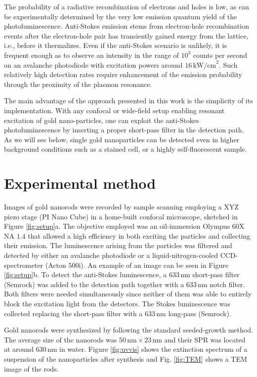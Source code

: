 \documentclass[journal=nalefd,manuscript=letter]{achemso}
\newcommand{\nm}{\ensuremath{\,\textrm{nm}}}
\newcommand{\pwr}{\ensuremath{\,\textrm{kW/cm}^2}}
\begin{document}
The probability of a radiative recombination of electrons and holes is low,
as can be experimentally determined by the very low emission quantum yield of
the photoluminescence\cite{Yorulmaz2012}\cite{Rao2015}\cite{Sonnichsen2002}. Anti-Stokes
emission stems from electron-hole recombination events after the electron-hole
pair has transiently gained energy from the lattice, i.e., before it thermalizes. Even if the
anti-Stokes scenario is unlikely, it is frequent enough as to observe an
intensity in the range of $10^3$ counts per second on an avalanche photodiode
with excitation powers around $16\pwr$. Such relatively high detection rates
require enhancement of the emission probability through the proximity of the
plasmon resonance\cite{Neupane2013}.

The main advantage of the approach presented in this work is the simplicity of
its implementation. With any confocal or wide-field setup enabling resonant
excitation of gold nano-particles, one can exploit the anti-Stokes
photoluminescence by inserting a proper short-pass filter in the detection path.
As we will see below, single gold nanoparticles can be detected even in higher background conditions
such as a stained cell, or a highly self-fluorescent sample.

\section{Experimental method}
Images of gold nanorods were recorded by sample scanning employing a XYZ piezo
stage (PI Nano Cube) in a  home-built confocal microscope, sketched in Figure
\ref{fig:setup}a. The objective employed was an oil-immersion Olympus 60X NA
$1.4$ that allowed a high efficiency in both exciting the particles and
collecting their emission. The luminescence arising from the particles was
filtered and detected by either an avalanche photodiode or a
liquid-nitrogen-cooled CCD-spectrometer (Acton $500\textrm{i}$). An example of
an image can be seen in Figure \ref{fig:setup}b. To detect the anti-Stokes
luminescence, a $633\nm$ short-pass filter (Semrock) was added to the detection
path together with a $633\nm$ notch filter. Both filters were needed
simultaneously since neither of them was able to entirely block the excitation
light from the detectors. The Stokes luminescence was collected replacing the
short-pass filter with a $633\nm$ long-pass (Semrock).

Gold nanorods were synthesized by following the standard seeded-growth
method\cite{Nikoobakht2003}. The average size of the nanorods was $50\nm\times
23\nm$ and their SPR was located at around $630\nm$ in water. Figure
\ref{fig:uvvis} shows the extinction spectrum of a suspension of the
nanoparticles after synthesis and Fig. \ref{fig:TEM} shows a TEM image of the
rods.
\end{document}
